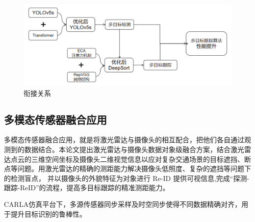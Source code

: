 \begin{figure}[htbp] %
	\centering
	\includegraphics[width=1\textwidth]{np15} %
	\caption{衔接关系} %
	\label{fig:np15} %
\end{figure}



\subsection{多模态传感器融合应用}
多模态传感器融合应用，就是将激光雷达与摄像头的相互配合，把他们各自通过观测到的数据结合。本论文提出激光雷达与摄像头数据对象级融合方案，结合激光雷达点云的三维空间坐标及摄像头二维视觉信息以应对复杂交通场景的目标遮挡、断点等问题。用激光雷达的精确的测距能力解决摄像头低照度、复杂的遮挡等问题下的检测盲点， 并以摄像头的外貌特征为对象进行 Re-ID 提供可视信息,完成“探测-跟踪-ReID”的流程，提高多目标跟踪的精准测距能力。

CARLA仿真平台下，多源传感器同步采样及时空同步使得不同数据精确对齐，用于提升目标识别的鲁棒性。

















